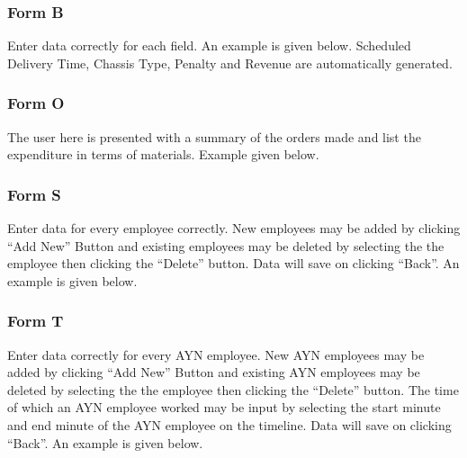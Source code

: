 \documentclass{l3proj}
\begin{document}
\subsubsection{Form B}
Enter data correctly for each field. An example is given below. Scheduled Delivery Time, Chassis Type, Penalty and Revenue are automatically generated.
\subsubsection{Form O}
The user here is presented with a summary of the orders made and list the expenditure in terms of materials. Example given below.
\subsubsection{Form S}
Enter data for every employee correctly. New employees may be added by clicking “Add New” Button and existing employees may be deleted by selecting the the employee then clicking the “Delete” button. Data will save on clicking “Back”. An example is given below.
\subsubsection{Form T}
Enter data correctly for every AYN employee. New AYN employees may be added by clicking “Add New” Button and existing AYN employees may be deleted by selecting the the employee then clicking the “Delete” button. The time of which an AYN employee worked may be input by selecting the start minute and end minute of the AYN employee on the timeline. Data will save on clicking “Back”. An example is given below.



\end{document}
